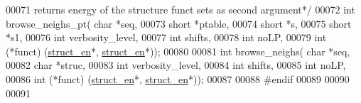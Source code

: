 \begin{DoxyCode}
00071 \textcolor{comment}{    returns energy of the structure funct sets as second argument*/}
00072 \textcolor{keywordtype}{int} browse\_neighs\_pt( \textcolor{keywordtype}{char} *seq,
00073                    \textcolor{keywordtype}{short} *ptable,
00074                    \textcolor{keywordtype}{short} *s,
00075                    \textcolor{keywordtype}{short} *s1,
00076                    \textcolor{keywordtype}{int} verbosity\_level,
00077                    \textcolor{keywordtype}{int} shifts,
00078                    \textcolor{keywordtype}{int} noLP,
00079                    \textcolor{keywordtype}{int} (*funct) (\hyperlink{struct__struct__en}{struct\_en}*, \hyperlink{struct__struct__en}{struct\_en}*));
00080 
00081 \textcolor{keywordtype}{int} browse\_neighs( \textcolor{keywordtype}{char} *seq,
00082                    \textcolor{keywordtype}{char} *struc,
00083                    \textcolor{keywordtype}{int} verbosity\_level,
00084                    \textcolor{keywordtype}{int} shifts,
00085                    \textcolor{keywordtype}{int} noLP,
00086                    \textcolor{keywordtype}{int} (*funct) (\hyperlink{struct__struct__en}{struct\_en}*, \hyperlink{struct__struct__en}{struct\_en}*));
00087 
00088 \textcolor{preprocessor}{#endif}
00089 
00090 
00091 
\end{DoxyCode}
